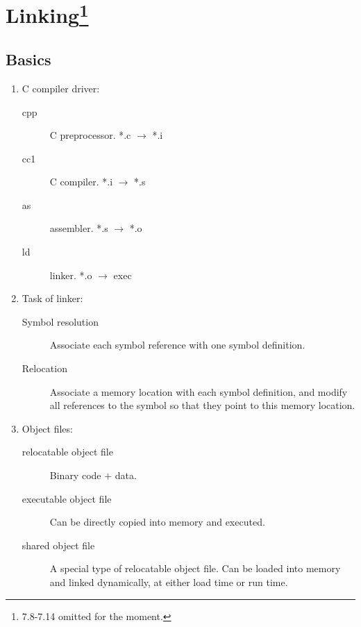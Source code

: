 \ifx\PREAMBLE\undefined


\fi
\newpage
\section[Linking]{Linking\footnote{7.8-7.14 omitted for the moment.}}
\subsection{Basics}
\begin{enumerate}
\item C compiler driver:
\begin{description}
	\item[cpp] C preprocessor. *.c $\rightarrow$ *.i
	\item[cc1] C compiler. *.i $\rightarrow$ *.s
	\item[as] assembler. *.s $\rightarrow$ *.o 
	\item[ld] linker. *.o $\rightarrow$ exec
\end{description}

\item Task of linker:
\begin{description}
	\item[Symbol resolution] Associate each symbol reference with one symbol definition.
	\item[Relocation] Associate a memory location with each symbol definition, and modify all references to the symbol so that they point to this memory location.
\end{description}

\item Object files:
\begin{description}
	\item[relocatable object file] Binary code + data.
	\item[executable object file] Can be directly copied into memory and executed.
	\item[shared object file] A special type of relocatable object file. Can be loaded into memory and linked dynamically, at either load time or run time.
\end{description}
\end{enumerate}
